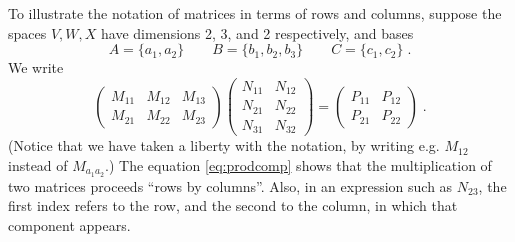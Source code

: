 \documentclass[12pt]{article}
\begin{document}
To illustrate the notation of matrices in terms of rows and columns,
suppose the spaces $V,W,X$
have dimensions 2, 3, and 2 respectively, and bases
$$A=\{a_1,a_2\}\qquad B=\{b_1,b_2,b_3\}\qquad C=\{c_1,c_2\}\;.$$
We write
$$
\begin{pmatrix}
M_{11} & M_{12} & M_{13} \\
M_{21} & M_{22} & M_{23}
\end{pmatrix}
\begin{pmatrix}
N_{11} & N_{12} \\
N_{21} & N_{22} \\
N_{31} & N_{32}
\end{pmatrix}
=
\begin{pmatrix}
P_{11} & P_{12} \\
P_{21} & P_{22}
\end{pmatrix}\;.
$$
(Notice that we have taken a liberty with the notation,
by writing e.g. $M_{12}$ instead of $M_{a_1a_2}$.)
The equation \eqref{eq:prodcomp} shows that the multiplication
of two matrices proceeds ``rows by columns''. Also, in an expression such
as $N_{23}$, the first index refers to the row, and the second to the
column, in which that component appears.
\end{document}
